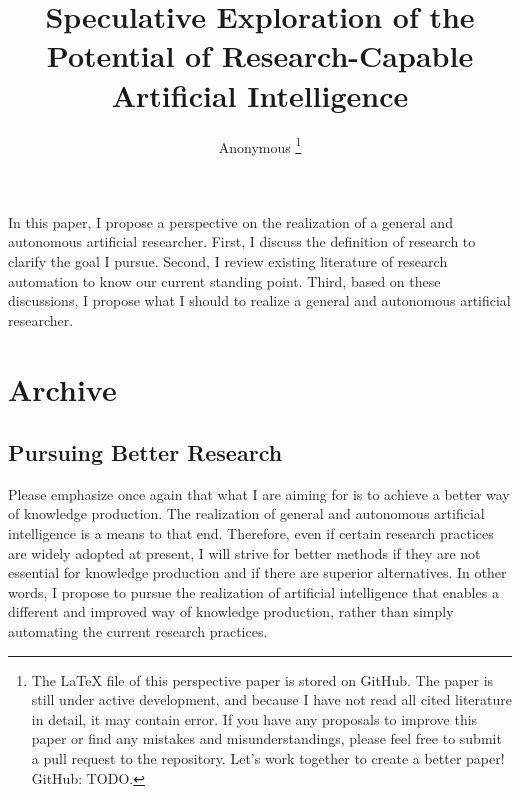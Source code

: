 \documentclass{book}
\title{Speculative Exploration of the Potential of Research-Capable Artificial Intelligence}
\author{Anonymous \footnote{The LaTeX file of this perspective paper is stored on GitHub. The paper is still under active development, and because I have not read all cited literature in detail, it may contain error. If you have any proposals to improve this paper or find any mistakes and misunderstandings, please feel free to submit a pull request to the repository. Let's work together to create a better paper! \\ GitHub: TODO. }}
\newenvironment{abstract}{}{}
\begin{document}
\sloppy
\maketitle
\tableofcontents

\begin{abstract}
    In this paper, I propose a perspective on the realization of a general and autonomous artificial researcher. First, I discuss the definition of research to clarify the goal I pursue. Second, I review existing literature of research automation to know our current standing point. Third, based on these discussions, I propose what I should to realize a general and autonomous artificial researcher.
\end{abstract}




% 
% 
% 



% 


\appendix



\chapter{Archive}

\section{Pursuing Better Research}
Please emphasize once again that what I are aiming for is to achieve a better way of knowledge production. The realization of general and autonomous artificial intelligence is a means to that end. Therefore, even if certain research practices are widely adopted at present, I will strive for better methods if they are not essential for knowledge production and if there are superior alternatives. In other words, I propose to pursue the realization of artificial intelligence that enables a different and improved way of knowledge production, rather than simply automating the current research practices.
\end{document}
